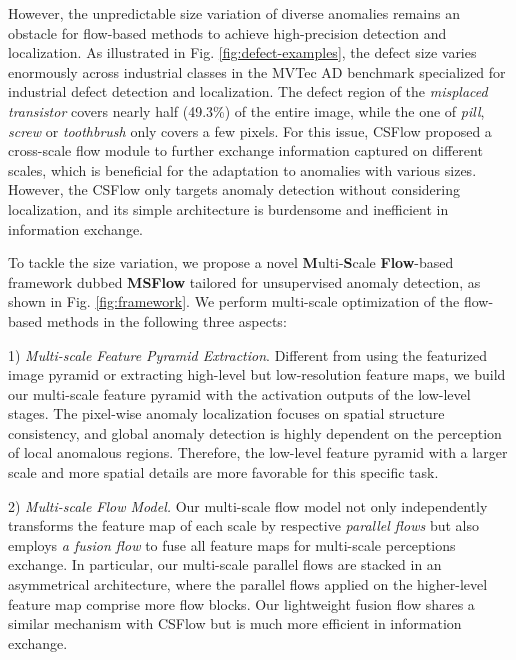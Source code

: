 \documentclass[lettersize,journal]{IEEEtran}
\begin{document}
However, the unpredictable size variation of diverse anomalies remains an obstacle for flow-based methods to achieve high-precision detection and localization. 
As illustrated in Fig. \ref{fig:defect-examples}, the defect size varies enormously across industrial classes in the MVTec AD benchmark specialized for industrial defect detection and localization. 
The defect region of the \textit{misplaced transistor} covers nearly half (49.3\%) of the entire image, while the one of \textit{pill}, \textit{screw} or \textit{toothbrush} only covers a few pixels. For this issue, CSFlow \cite{rudolph2022csflow} proposed a cross-scale flow module to further exchange information captured on different scales, which is beneficial for the adaptation to anomalies with various sizes. However, the CSFlow only targets anomaly detection without considering localization, and its simple architecture is burdensome and inefficient in information exchange.

To tackle the size variation, we propose a novel \textbf{M}ulti-\textbf{S}cale \textbf{Flow}-based framework dubbed \textbf{MSFlow} tailored for unsupervised anomaly detection, as shown in Fig. \ref{fig:framework}. We perform multi-scale optimization of the flow-based methods in the following three aspects: 

1) \textit{Multi-scale Feature Pyramid Extraction}. Different from \cite{rudolph2021differnet,rudolph2022csflow} using the featurized image pyramid or \cite{gudovskiy2022cflow} extracting high-level but low-resolution feature maps, we build our multi-scale feature pyramid with the activation outputs of the low-level stages.
The pixel-wise anomaly localization focuses on spatial structure consistency, and global anomaly detection is highly dependent on the perception of local anomalous regions.
Therefore, the low-level feature pyramid with a larger scale and more spatial details are more favorable for this specific task. 

2) \textit{Multi-scale Flow Model.} Our multi-scale flow model not only independently transforms the feature map of each scale by respective \textit{parallel flows} but also employs \textit{a fusion flow} to fuse all feature maps for multi-scale perceptions exchange. In particular, our multi-scale parallel flows are stacked in an asymmetrical architecture, where the parallel flows applied on the higher-level feature map comprise more flow blocks. Our lightweight fusion flow shares a similar mechanism with CSFlow\cite{rudolph2022csflow} but is much more efficient in information exchange.
\end{document}
